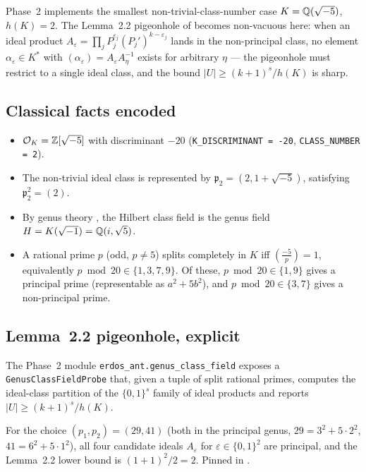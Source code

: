 
Phase~2 implements the smallest non-trivial-class-number case
$K = \mathbb{Q}(\sqrt{-5})$, $h(K) = 2$. The Lemma~2.2 pigeonhole of
\cite{OpenAI2026Proof} becomes non-vacuous here: when an ideal product
$A_\varepsilon = \prod_j P_j^{\varepsilon_j} (P_j')^{k - \varepsilon_j}$
lands in the non-principal class, no element $\alpha_\varepsilon \in K^*$
with $(\alpha_\varepsilon) = A_\varepsilon A_\eta^{-1}$ exists for
arbitrary $\eta$ --- the pigeonhole must restrict to a single ideal
class, and the bound $|U| \geq (k+1)^s / h(K)$ is sharp.

\subsection{Classical facts encoded}

\begin{itemize}[leftmargin=*]
  \item $\mathcal{O}_K = \mathbb{Z}[\sqrt{-5}]$ with discriminant $-20$
        (\texttt{K\_DISCRIMINANT = -20}, \texttt{CLASS\_NUMBER = 2}).
  \item The non-trivial ideal class is represented by
        $\mathfrak{p}_2 = (2, 1 + \sqrt{-5})$, satisfying
        $\mathfrak{p}_2^2 = (2)$.
  \item By genus theory \cite[Theorem~6.1]{Cox1989}, the Hilbert class
        field is the genus field $H = K(\sqrt{-1}) = \mathbb{Q}(i, \sqrt{5})$.
  \item A rational prime $p$ (odd, $p \neq 5$) splits completely in $K$
        iff $\left(\frac{-5}{p}\right) = 1$, equivalently
        $p \bmod 20 \in \{1, 3, 7, 9\}$. Of these, $p \bmod 20 \in \{1, 9\}$
        gives a principal prime (representable as $a^2 + 5b^2$), and
        $p \bmod 20 \in \{3, 7\}$ gives a non-principal prime.
\end{itemize}

\subsection{Lemma~2.2 pigeonhole, explicit}

The Phase~2 module \texttt{erdos\_ant.genus\_class\_field} exposes a
\texttt{GenusClassFieldProbe} that, given a tuple of split rational
primes, computes the ideal-class partition of the
$\{0,1\}^s$ family of ideal products and reports
$|U| \geq (k+1)^s / h(K)$.

\begin{verification}\label{ver:lemma22_principal}
For the choice $(p_1, p_2) = (29, 41)$ (both in the principal genus,
$29 = 3^2 + 5 \cdot 2^2$, $41 = 6^2 + 5 \cdot 1^2$), all four candidate
ideals $A_\varepsilon$ for $\varepsilon \in \{0,1\}^2$ are principal,
and the Lemma~2.2 lower bound is
$(1 + 1)^2 / 2 = 2$. Pinned in
.
\end{verification}

